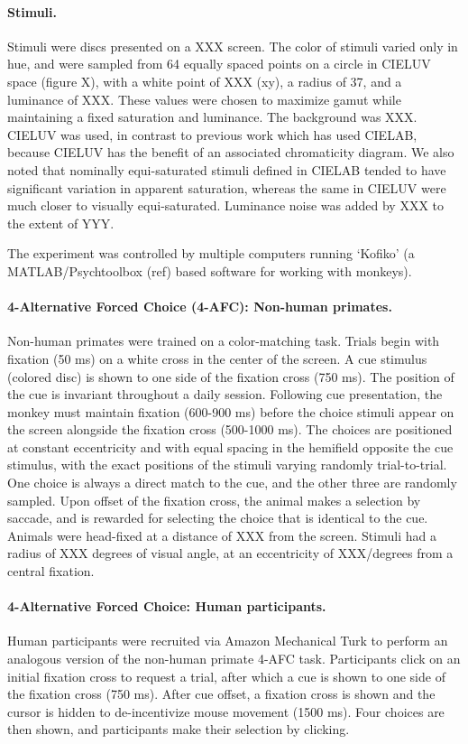 \paragraph{Stimuli.} 
Stimuli were discs presented on a XXX screen.
The color of stimuli varied only in hue, and were sampled from 64 equally spaced points on a circle in CIELUV space (figure X), with a white point of XXX (xy), a radius of 37, and a luminance of XXX. These values were chosen to maximize gamut while maintaining a fixed saturation and luminance. The background was XXX.
CIELUV was used, in contrast to previous work which has used CIELAB, because CIELUV has the benefit of an associated chromaticity diagram. 
We also noted that nominally equi-saturated stimuli defined in CIELAB tended to have significant variation in apparent saturation, whereas the same in CIELUV were much closer to visually equi-saturated. 
Luminance noise was added by XXX to the extent of YYY.

The experiment was controlled by multiple computers running `Kofiko' (a MATLAB/Psychtoolbox (ref) based software for working with monkeys).

\paragraph{4-Alternative Forced Choice (4-AFC): Non-human primates.} Non-human primates were trained on a color-matching task. Trials begin with fixation (50 ms) on a white cross in the center of the screen. A cue stimulus (colored disc) is shown to one side of the fixation cross (750 ms). The position of the cue is invariant throughout a daily session. Following cue presentation, the monkey must maintain fixation (600-900 ms) before the choice stimuli appear on the screen alongside the fixation cross (500-1000 ms). The choices are positioned at constant eccentricity and with equal spacing in the hemifield opposite the cue stimulus, with the exact positions of the stimuli varying randomly trial-to-trial. One choice is always a direct match to the cue, and the other three are randomly sampled. Upon offset of the fixation cross, the animal makes a selection by saccade, and is rewarded for selecting the choice that is identical to the cue. Animals were head-fixed at a distance of XXX from the screen. Stimuli had a radius of XXX degrees of visual angle, at an eccentricity of XXX/degrees from a central fixation.

\paragraph{4-Alternative Forced Choice: Human participants.} Human participants were recruited via Amazon Mechanical Turk to perform an analogous version of the non-human primate 4-AFC task. Participants click on an initial fixation cross to request a trial, after which a cue is shown to one side of the fixation cross (750 ms). After cue offset, a fixation cross is shown and the cursor is hidden to de-incentivize mouse movement (1500 ms). Four choices are then shown, and participants make their selection by clicking. 

